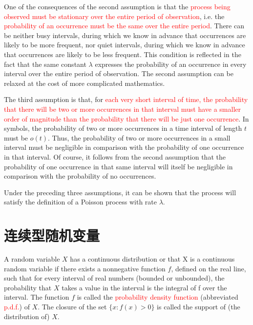 \documentclass[12pt,a4paper]{article}
\begin{document}
One of the consequences of the second assumption is that the \textcolor{red}{process being observed must be stationary over the entire period of observation}, i.e. the \textcolor{red}{probability of an occurrence must be the same over the entire period}. There can be neither busy intervals, during which we know in advance that occurrences are likely to be more frequent, nor quiet intervals, during which we know in advance that occurrences are likely to be less frequent. This condition is reflected in the fact that the same constant $\lambda$ expresses the probability of an occurrence in every interval over the entire period of observation. The second assumption can be relaxed at the cost of more complicated mathematics.

The third assumption is that, for \textcolor{red}{each very short interval of time, the probability that there will be two or more occurrences in that interval must have a smaller order of magnitude than the probability that there will be just one occurrence}. In symbols, the probability of two or more occurrences in a time interval of length $t$ must be $o(t)$. Thus, the probability of two or more occurrences in a small interval must be negligible in comparison with the probability of one occurrence in that interval. Of course, it follows from the second assumption that the probability of one occurrence in that same interval will itself be negligible in comparison with the probability of no occurrences.

Under the preceding three assumptions, it can be shown that the process will satisfy the definition of a Poisson process with rate $\lambda$. 

























\section{连续型随机变量}
A random variable $X$ has a continuous distribution or that X is a continuous random variable if there exists a nonnegative function $f$, defined on the real line, such that for every interval of real numbers (bounded or unbounded), the probability that $X$ takes a value in the interval is the integral of f over the interval. The function $f$ is called the \textcolor{red}{probability density function} (abbreviated \textcolor{red}{p.d.f.}) of $X$. The closure of the set $\{x : f(x) > 0\}$ is called the support of (the distribution of) $X$.
\end{document}
